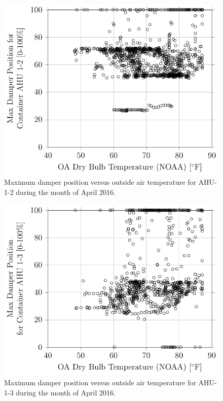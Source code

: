 \begin{figure}
\centering
\includegraphics{Plots/MaximumDamperPosition-1-2.pdf} 
\caption{Maximum damper position versus outside air temperature for AHU-1-2 during the month of April 2016.}
\label{fig:MaxDamperPositionforContainerAHU12vsOADryBulbTemperatureNOAA}
\end{figure}

\begin{figure}
\centering
\includegraphics{Plots/MaximumDamperPosition-1-3.pdf}
\caption{Maximum damper position versus outside air temperature for AHU-1-3 during the month of April 2016.}
\label{fig:MaxDamperPositionforContainerAHU13vsOADryBulbTemperatureNOAA}
\end{figure}


